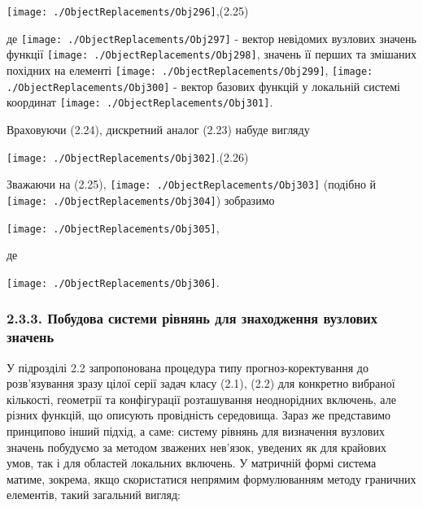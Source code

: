 \texttt{[image: ./ObjectReplacements/Obj296]},(2.25)

де
\texttt{[image: ./ObjectReplacements/Obj297]}
- вектор невідомих вузлових значень функції
\texttt{[image: ./ObjectReplacements/Obj298]},
значень її перших та змішаних похідних на елементі
\texttt{[image: ./ObjectReplacements/Obj299]},
\texttt{[image: ./ObjectReplacements/Obj300]}
- вектор базових функцій у локальній системі координат
\texttt{[image: ./ObjectReplacements/Obj301]}.

Враховуючи (2.24), дискретний аналог (2.23) набуде вигляду

\texttt{[image: ./ObjectReplacements/Obj302]}.(2.26)

Зважаючи на (2.25),
\texttt{[image: ./ObjectReplacements/Obj303]}
(подібно й
\texttt{[image: ./ObjectReplacements/Obj304]})
зобразимо

\texttt{[image: ./ObjectReplacements/Obj305]},

де

\texttt{[image: ./ObjectReplacements/Obj306]}.

\hypertarget{ux43fux43eux431ux443ux434ux43eux432ux430-ux441ux438ux441ux442ux435ux43cux438-ux440ux456ux432ux43dux44fux43dux44c-ux434ux43bux44f-ux437ux43dux430ux445ux43eux434ux436ux435ux43dux43dux44f-ux432ux443ux437ux43bux43eux432ux438ux445-ux437ux43dux430ux447ux435ux43dux44c}{%
\subsubsection[2.3.3. Побудова системи рівнянь для знаходження вузлових
значень]{\texorpdfstring{\protect\hypertarget{anchor-40}{}{}\protect\hypertarget{anchor-41}{}{}2.3.3.
Побудова системи рівнянь для знаходження вузлових
значень}{2.3.3. Побудова системи рівнянь для знаходження вузлових значень}}\label{ux43fux43eux431ux443ux434ux43eux432ux430-ux441ux438ux441ux442ux435ux43cux438-ux440ux456ux432ux43dux44fux43dux44c-ux434ux43bux44f-ux437ux43dux430ux445ux43eux434ux436ux435ux43dux43dux44f-ux432ux443ux437ux43bux43eux432ux438ux445-ux437ux43dux430ux447ux435ux43dux44c}}

У підрозділі 2.2 запропонована процедура типу прогноз-коректування до
розв'язування зразу цілої серії задач класу (2.1), (2.2) для конкретно
вибраної кількості, геометрії та конфігурації розташування неоднорідних
включень, але різних функцій, що описують провідність середовища. Зараз
же представимо принципово інший підхід, а саме: систему рівнянь для
визначення вузлових значень побудуємо за методом зважених нев'язок,
уведених як для крайових умов, так і для областей локальних включень. У
матричній формі система матиме, зокрема, якщо скористатися непрямим
формулюванням методу граничних елементів, такий загальний вигляд:

